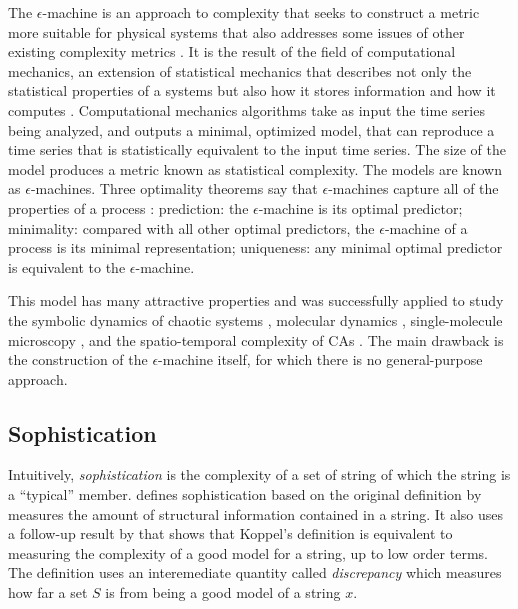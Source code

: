 The $\epsilon$-machine is an approach to complexity that seeks to construct a metric
more suitable for physical systems that also addresses some issues of other
existing complexity metrics \parencite{crutchfieldOrderChaos2012}. It is the
result of the field of computational mechanics, an extension of statistical
mechanics that describes not only the statistical properties of a systems but
also how it stores information and how it computes
\parencite{crutchfieldInferringStatisticalComplexity1989,
  crutchfieldCalculiEmergenceComputation1994,
  feldmanMeasuresStatisticalComplexity1998, crutchfieldOrderChaos2012}.
Computational mechanics algorithms take as input the time series being analyzed,
and outputs a minimal, optimized model, that can reproduce a time series that is
statistically equivalent to the input time series. The size of the model
produces a metric known as statistical complexity. The models are known as
$\epsilon$-machines. Three optimality theorems say that $\epsilon$-machines capture all of the
properties of a process
\parencite{crutchfieldInferringStatisticalComplexity1989,
  crutchfieldThermodynamicDepthCausal1999,
  shaliziComputationalMechanicsPattern2001}: prediction: the $\epsilon$-machine is its
optimal predictor; minimality: compared with all other optimal predictors, the
$\epsilon$-machine of a process is its minimal representation; uniqueness: any minimal
optimal predictor is equivalent to the $\epsilon$-machine.

This model has many attractive properties and was successfully applied to study
the symbolic dynamics of chaotic systems
\parencite{crutchfieldCalculiEmergenceComputation1994}, molecular dynamics
\parencite{ryabovComputationalMechanicsMolecular2011}, single-molecule
microscopy \parencite{kellyNewMethodInferring2012}, and the spatio-temporal
complexity of \acp{CA} \parencite{crutchfieldTurbulentPatternBases1993,
  hansonComputationalMechanicsCellular1997,
  shaliziQuantifyingSelfOrganizationOptimal2004}. The main drawback is the
construction of the $\epsilon$-machine itself, for which there is no
general-purpose approach.

\subsection{Sophistication}

Intuitively, \emph{sophistication} is the complexity of a set of string of which
the string is a ``typical'' member.
\textcite{motaSophisticationRandomnessDeficiency2013} defines sophistication
based on the original definition by \textcite{koppelStructure1988,
  koppelAlmostMachineindependentTheory1991a} measures the amount of structural
information contained in a string. It also uses a follow-up result by
\parencite{vitanyiMeaningfulInformation2006} that shows that Koppel's definition
is equivalent to measuring the complexity of a good model for a string, up to
low order terms. The definition uses an interemediate quantity called
\emph{discrepancy} which measures how far a set $S$ is from being a good model
of a string $x$.

